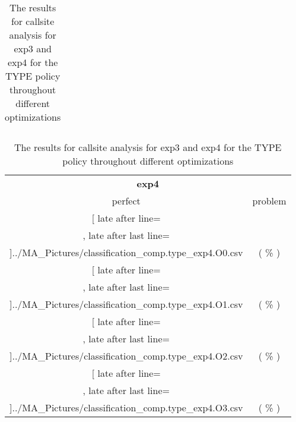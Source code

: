 \begin{table}[!htbp]
{\begin{tabular}{l|c|c|c}
    	\end{tabular}

	\begin{tabular}{|c|c}%

	\toprule
	\multicolumn{2}{c}{\bfseries  exp4}\\
	
	perfect &  problem %
	\\\midrule
	\csvreader[ late after line=\\, late after last line=\\\midrule]{../MA_Pictures/classification_comp.type_exp4.O0.csv}{
}
	{\csvcoliv ( \csvcolv \% ) & \csvcolvi( \csvcolvii\% )}%



\multicolumn{1}{c}{} 
	\\\midrule
	\csvreader[ late after line=\\, late after last line=\\\midrule]{../MA_Pictures/classification_comp.type_exp4.O1.csv}{
}
	{\csvcoliv ( \csvcolv \% ) & \csvcolvi( \csvcolvii\% )}%
	
	
\multicolumn{1}{c}{}
	\\\midrule
	\csvreader[ late after line=\\, late after last line=\\\midrule]{../MA_Pictures/classification_comp.type_exp4.O2.csv}{
}
	{\csvcoliv ( \csvcolv \% ) & \csvcolvi( \csvcolvii\% )}%
	

\multicolumn{1}{c}{}
	\\\midrule
	\csvreader[ late after line=\\, late after last line=\\\bottomrule]{../MA_Pictures/classification_comp.type_exp4.O3.csv}{
}
	{\csvcoliv ( \csvcolv \% ) & \csvcolvi( \csvcolvii\% )}%


    	\end{tabular}
}
		\caption {The results for callsite analysis for exp3 and exp4 for the TYPE policy throughout different optimizations}
		\label{tbl:CSexp34TYPE}
\end{table}
\newpage
\newpage

